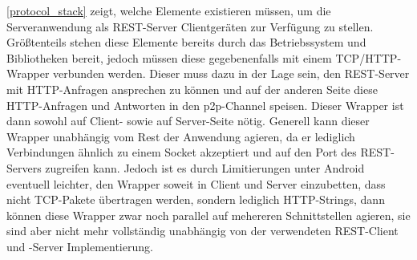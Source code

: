     \figurename \ref{protocol_stack} zeigt, welche Elemente existieren müssen, um die Serveranwendung als REST-Server Clientgeräten zur Verfügung zu stellen. Größtenteils stehen diese Elemente bereits durch das Betriebssystem und Bibliotheken bereit, jedoch müssen diese gegebenenfalls mit einem TCP/HTTP-Wrapper verbunden werden. Dieser muss dazu in der Lage sein, den REST-Server mit HTTP-Anfragen ansprechen zu können und auf der anderen Seite diese HTTP-Anfragen und Antworten in den p2p-Channel speisen. Dieser Wrapper ist dann sowohl auf Client- sowie auf Server-Seite nötig. Generell kann dieser Wrapper unabhängig vom Rest der Anwendung agieren, da er lediglich Verbindungen ähnlich zu einem Socket akzeptiert und auf den Port des REST-Servers zugreifen kann. Jedoch ist es durch Limitierungen unter Android eventuell leichter, den Wrapper soweit in Client und Server einzubetten, dass nicht TCP-Pakete übertragen werden, sondern lediglich HTTP-Strings, dann können diese Wrapper zwar noch parallel auf mehereren Schnittstellen agieren, sie sind aber nicht mehr vollständig unabhängig von der verwendeten REST-Client und -Server Implementierung.